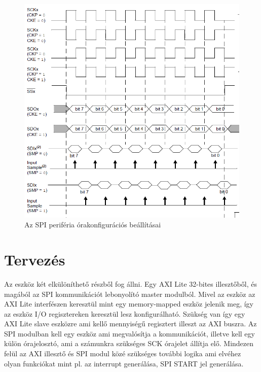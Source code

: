 \documentclass[a4paper,11pt]{article}
\begin{document}
\begin{figure}[H]
	\begin{center}
	\includegraphics[scale=2]{spi_clkdiag.png}
	\caption{Az SPI periféria órakonfigurációs beállításai}
	\label{fig:spi_clkdiag}
	\end{center}
\end{figure}

\section{Tervezés}

Az eszköz két elkülöníthető részből fog állni. Egy AXI Lite 32-bites illesztőből, és magából az SPI kommunikációt lebonyolító master modulból. Mivel az eszköz az AXI Lite interfészen keresztül mint egy memory-mapped eszköz jelenik meg, így az eszköz I/O regisztereken keresztül lesz konfigurálható. Szükség van így egy AXI Lite slave eszközre ami kellő mennyiségű regisztert illeszt az AXI buszra. Az SPI modulban kell egy eszköz ami megvalósítja a kommunikációt, illetve kell egy külön órajelosztó, ami a számunkra szükséges SCK órajelet állítja elő. Mindezen felül az AXI illesztő és SPI modul közé szükséges további logika ami elvéhez olyan funkciókat mint pl. az interrupt generálása, SPI START jel generálása.
\end{document}
